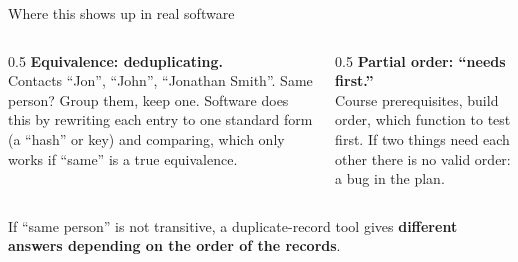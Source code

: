 \begin{frame}{Where this shows up in real software}
\begin{columns}[T]
\begin{column}{0.5\textwidth}
\textbf{Equivalence: deduplicating.}\\
Contacts ``Jon'', ``John'', ``Jonathan Smith''. Same person? Group them, keep one. Software does this by rewriting each entry to one standard form (a ``hash'' or key) and comparing, which only works if ``same'' is a true equivalence.
\end{column}
\begin{column}{0.5\textwidth}
\textbf{Partial order: ``needs first.''}\\
Course prerequisites, build order, which function to test first. If two things need each other there is no valid order: a bug in the plan.
\end{column}
\end{columns}
\vspace{8pt}
If ``same person'' is not transitive, a duplicate-record tool gives \textbf{different answers depending on the order of the records}.
\end{frame}
